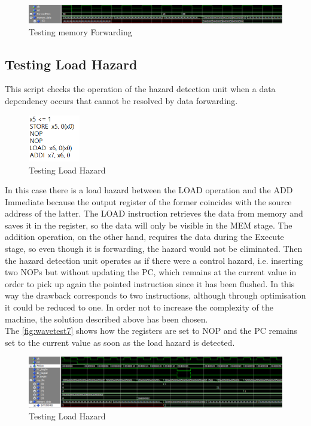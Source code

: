 \begin{figure}[H]
	\centering
	\includegraphics[width=1\textwidth]{sec3/images/wave_test6.png}
	\caption{Testing memory Forwarding}
	\label{fig:wavetest6}
\end{figure}

\subsection{Testing Load Hazard}
This script checks the operation of the hazard detection unit when a data dependency occurs that cannot be resolved by data forwarding.
\begin{figure}[H]
	\centering
	\includegraphics[width=0.2\textwidth]{sec3/images/test7.png}
	\caption{Testing Load Hazard}
	\label{fig:test7}
\end{figure}
\noindent In this case there is a load hazard between the LOAD operation and the ADD Immediate because the output register of the former coincides with the source address of the latter. The LOAD instruction retrieves the data from memory and saves it in the register, so the data will only be visible in the MEM stage. The addition operation, on the other hand, requires the data during the Execute stage, so even though it is forwarding, the hazard would not be eliminated. Then the hazard detection unit operates as if there were a control hazard, i.e. inserting two NOPs but without updating the PC, which remains at the current value in order to pick up again the pointed instruction since it has been flushed. In this way the drawback corresponds to two instructions, although through optimisation it could be reduced to one. In order not to increase the complexity of the machine, the solution described above has been chosen.\\
The \autoref{fig:wavetest7} shows how the registers are set to NOP and the PC remains set to the current value as soon as the load hazard is detected.
\begin{figure}[H]
	\centering
	\includegraphics[width=1\textwidth]{sec3/images/wave_test7.png}
	\caption{Testing Load Hazard}
	\label{fig:wavetest7}
\end{figure}

